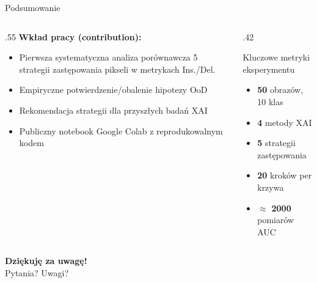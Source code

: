 \documentclass[aspectratio=169, 12pt]{beamer}
\begin{document}
\begin{frame}{Podsumowanie}
  \begin{columns}[T]
    \begin{column}{.55\textwidth}
      \textbf{Wkład pracy (contribution):}
      \begin{itemize}
        \item Pierwsza systematyczna analiza porównawcza
              5 strategii zastępowania pikseli w metrykach Ins./Del.
        \item Empiryczne potwierdzenie/obalenie hipotezy OoD
        \item Rekomendacja strategii dla przyszłych badań XAI
        \item Publiczny notebook Google Colab z reprodukowalnym kodem
      \end{itemize}
    \end{column}
    \begin{column}{.42\textwidth}
      \begin{block}{Kluczowe metryki eksperymentu}
        \begin{itemize}
          \item \textbf{50} obrazów, 10 klas
          \item \textbf{4} metody XAI
          \item \textbf{5} strategii zastępowania
          \item \textbf{20} kroków per krzywa
          \item $\approx$ \textbf{2000} pomiarów AUC
        \end{itemize}
      \end{block}
    \end{column}
  \end{columns}

  \vspace{10pt}
  \begin{center}
    \textbf{\Large Dziękuję za uwagę!}\\[6pt]
    \small Pytania? Uwagi?
  \end{center}
\end{frame}


\appendix
\end{document}
